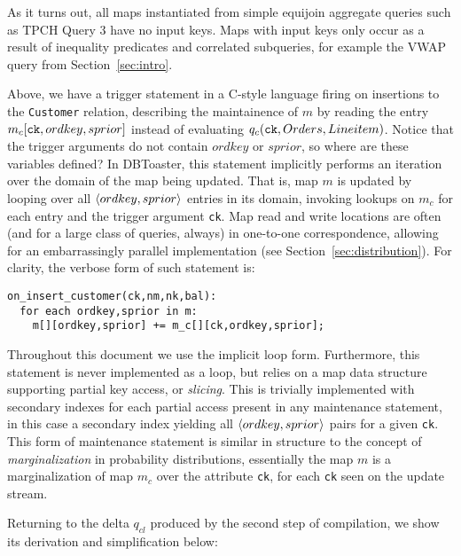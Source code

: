 \noindent
As it turns out, all maps instantiated from simple equijoin aggregate queries
such as TPCH Query 3 have no input keys. Maps with input keys only occur as a
result of inequality predicates and correlated subqueries, for example the VWAP
query from Section~\ref{sec:intro}.

Above, we have a trigger statement in a C-style language firing on insertions to
the {\tt Customer} relation, describing the maintainence of $m$ by reading the
entry $m_c[\mbox{{\tt ck}},ordkey,sprior]$ instead of evaluating $q_c(\mbox{{\tt
ck}}, Orders, Lineitem)$. Notice that the trigger arguments do not contain
$ordkey$ or $sprior$, so where are these variables defined? In DBToaster, this
statement implicitly performs an iteration over the domain of the map being
updated. That is, map $m$ is updated by looping over all ${\langle ordkey,sprior\rangle}$
entries in its domain, invoking lookups on $m_c$ for each entry and the trigger
argument {\tt ck}. Map read and write locations are often (and for a large class
of queries, always) in one-to-one correspondence, allowing for an embarrassingly
parallel implementation (see Section~\ref{sec:distribution}). For clarity, the
verbose form of such statement is:

\begin{verbatim}
on_insert_customer(ck,nm,nk,bal):
  for each ordkey,sprior in m:
    m[][ordkey,sprior] += m_c[][ck,ordkey,sprior];
\end{verbatim}

\noindent Throughout this document we use the implicit loop form.
Furthermore, this statement is never implemented as a loop, but relies on a map
data structure supporting partial key access, or \textit{slicing}. This is
trivially implemented with secondary indexes for each partial access present in
any maintenance statement, in this case a secondary index yielding all
${\langle ordkey,sprior\rangle}$ pairs for a given \texttt{ck}.
This form of maintenance statement is similar in structure to the concept of
\textit{marginalization} in probability distributions, essentially the map $m$
is a marginalization of map $m_c$ over the attribute \texttt{ck}, for each
\texttt{ck} seen on the update stream.

Returning to the delta $q_{cl}$ produced by the second step of compilation, we
show its derivation and simplification below: 

